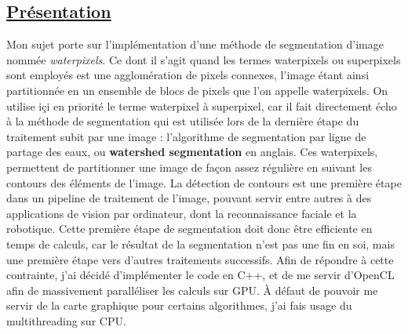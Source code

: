 \documentclass[notitlepage, a4paper, 12pt]{report}
\begin{document}
\begin{flushleft}

\section*{\underline{Présentation}}

Mon sujet porte sur l'implémentation d'une méthode de segmentation d'image nommée \emph{waterpixels}.
\newline
\newline
Ce dont il s'agit quand les termes waterpixels ou superpixels sont employés est une agglomération de pixels connexes, l'image étant ainsi partitionnée en un ensemble de blocs de pixels que l'on appelle waterpixels.
\newline
\newline
On utilise içi en priorité le terme waterpixel à  superpixel, car il fait directement écho à la méthode de segmentation qui est utilisée lors de la dernière étape du traitement subit par une image : l'algorithme de segmentation par ligne de partage des eaux, ou \textbf{watershed segmentation} en anglais.  
\newline
\newline
Ces waterpixels, permettent de partitionner une image de façon assez régulière en suivant les contours des éléments de l'image.
\newline
\newline
La détection de contours est une première étape dans un pipeline de traitement de l'image, pouvant servir entre autres à des applications de vision par ordinateur, dont la reconnaissance faciale et la robotique.
\newline
\newline
Cette première étape de segmentation doit donc être efficiente en temps de calculs, car le résultat de la segmentation n'est pas une fin en soi, mais une première étape vers d'autres traitements successifs.
\newline
\newline
Afin de répondre à cette contrainte, j'ai décidé d'implémenter le code en C++, et de me servir d'OpenCL afin de massivement paralléliser les calculs sur GPU. À défaut de pouvoir me servir de la carte graphique pour certains algorithmes, j'ai fais usage du multithreading sur CPU.

\newpage


\end{flushleft}
\end{document}
